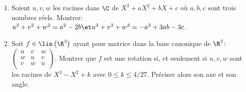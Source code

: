 \begin{enonce}
\begin{exercise}[ID={RMS 125 E834, 2014 Centrale PSI},subtitle={2014 Centrale PSI},tags={}]
\begin{enumerate}
  \item Soient $u,v,w$ les racines dans $\C$ de $X^3+aX^2+bX+c$ où $a,b,c$ sont trois nombres réels.
    Montrer: 
    $u^2+v^2+w^2=a^2-2b \et u^3+v^3+w^3=-a^3+3ab-3c$.

  \item Soit $f\in\lin\left( \R^3\right)$ ayant pour matrice dans la base canonique de $\R^3$:
    $\begin{pmatrix} u & v & w \\ w & u & v \\ v & w & u \\ \end{pmatrix}$.
    Montrer que $f$ est une rotation si, et seulement si $u,v,w$ sont les racines de $X^3-X^2+k$ avec $0\leq k\leq 4/27$.
    Préciser alors son axe et son angle.
\end{enumerate}
\end{exercise}
\begin{solution}
\end{solution}
\end{enonce}
